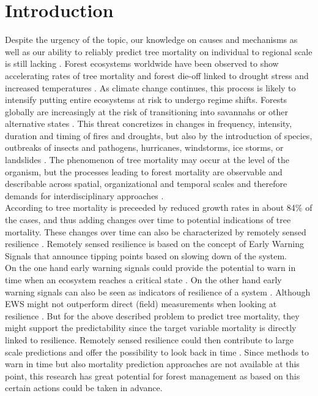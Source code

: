 \section{Introduction}\label{sec:intro}
Despite the urgency of the topic, our knowledge on causes and mechanisms as well as our ability to reliably predict tree mortality on individual to regional scale is still lacking \citep{mcdowell2013, hartmann2015}. Forest ecosystems worldwide have been observed to show accelerating rates of tree mortality and forest die-off linked to drought stress and increased temperatures \citep{allen2010, chaparro2017, vanmantgen2009}. As climate change continues, this process is likely to intensify \citep{allen2015} putting entire ecosystems at risk to undergo regime shifts. Forests globally are increasingly at the risk of transitioning into savannahs or other alternative states \citep{hirota2011}. This threat concretizes in changes in frequency, intensity, duration and timing of fires and droughts, but also by the introduction of species, outbreaks of insects and pathogens, hurricanes, windstorms, ice storms, or landslides \citep{dale2001}. The phenomenon of tree mortality may occur at the level of the organism, but the processes leading to forest mortality are observable and describable across spatial, organizational and temporal scales and therefore demands for interdisciplinary approaches \citep{hartmann2015}.\\
According to \cite{cailleret2017} tree mortality is preceeded by reduced growth rates in about 84\% of the cases, and thus adding changes over time to potential indications of tree mortality. These changes over time can also be characterized by remotely sensed \gls{resilience} \citep{verbesselt2016}. Remotely sensed \gls{resilience} is based on the concept of Early Warning Signals \citep[EWS,][]{carpenter2006, carpenter2008, dakos2008} that announce tipping points based on slowing down of the system.\\
On the one hand early warning signals could provide the potential to warn in time when an ecosystem reaches a critical state \citep{dakos2014}. On the other hand early warning signals can also be seen as indicators of resilience of a system \citep{dakos2012}. Although EWS might not outperform direct (field) measurements when looking at resilience \citep{vbelzen2017}. But for the above described problem to predict tree mortality, they might support the predictability since the target variable mortality is directly linked to resilience. Remotely sensed resilience could then contribute to large scale predictions and offer the possibility to look back in time \citep{verbesselt2016}. Since methods to warn in time but also mortality prediction approaches are not available at this point, this research has great potential for forest management as based on this certain actions could be taken in advance.\\






